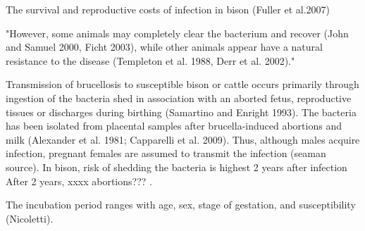 \documentclass[letterpaper,12pt]{article}
\begin{document}
The survival and reproductive costs of infection in bison (Fuller et al.2007)

"However, some animals may completely clear the bacterium and recover (John and Samuel 2000, Ficht 2003), while other animals appear have a natural resistance to the disease (Templeton et al. 1988, Derr et al. 2002)."


Transmission of brucellosis to susceptible bison or cattle occurs primarily through ingestion of  the bacteria shed in association with an aborted fetus, reproductive tissues or discharges during birthing (Samartino and Enright 1993).  The bacteria has been isolated from placental samples after brucella-induced abortions and milk (Alexander et al. 1981; Capparelli et al. 2009).    Thus, although males acquire infection, pregnant females are assumed to transmit the infection (seaman source).  In bison, risk of shedding the bacteria is highest 2 years after infection
After 2 years, xxxx abortions??? .

The incubation period ranges with age, sex, stage of gestation, and susceptibility (Nicoletti).
\end{document}
